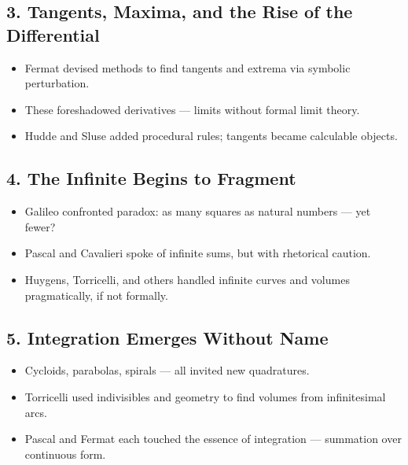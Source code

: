 \documentclass[9pt]{article}
\begin{document}
\subsection*{3. Tangents, Maxima, and the Rise of the Differential}
\begin{itemize}
  \item Fermat devised methods to find tangents and extrema via symbolic perturbation.
  \item These foreshadowed derivatives — limits without formal limit theory.
  \item Hudde and Sluse added procedural rules; tangents became calculable objects.
\end{itemize}

\subsection*{4. The Infinite Begins to Fragment}
\begin{itemize}
  \item Galileo confronted paradox: as many squares as natural numbers — yet fewer?
  \item Pascal and Cavalieri spoke of infinite sums, but with rhetorical caution.
  \item Huygens, Torricelli, and others handled infinite curves and volumes pragmatically, if not formally.
\end{itemize}

\subsection*{5. Integration Emerges Without Name}
\begin{itemize}
  \item Cycloids, parabolas, spirals — all invited new quadratures.
  \item Torricelli used indivisibles and geometry to find volumes from infinitesimal arcs.
  \item Pascal and Fermat each touched the essence of integration — summation over continuous form.
\end{itemize}
\end{document}
